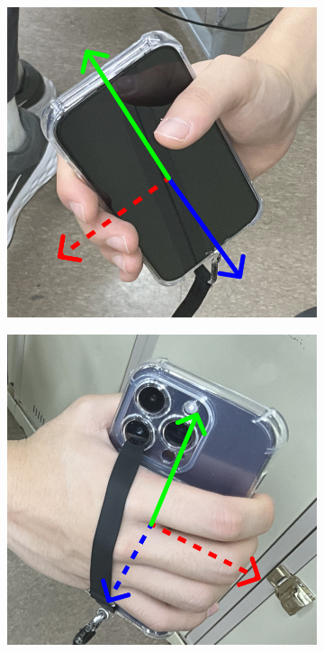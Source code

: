 \documentclass{article}
\begin{document}
\FloatBarrier
\begin{figure}[h]
    \centering
    \begin{subfigure}{0.33\textwidth}
        \centering
        \includegraphics[width=\textwidth]{2_3_3_1.png}
        \label{fig:grip_1}
    \end{subfigure}%
    \begin{subfigure}{0.33\textwidth}
        \centering
        \includegraphics[width=\textwidth]{2_3_3_2.png}

\end{subfigure}
\end{figure}
\end{document}
